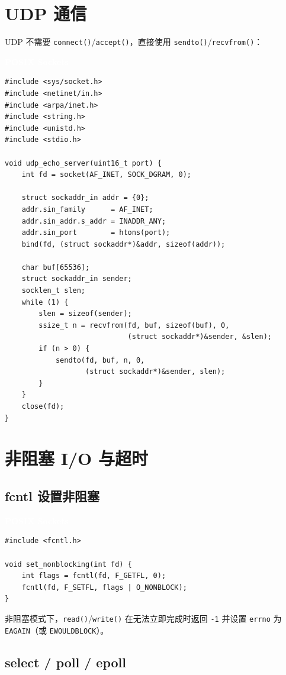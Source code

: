 \documentclass[12pt,a4paper,fontset=fandol]{ctexbook}
\newcommand{\Fn}[1]{\texttt{#1()}}
\newcommand{\Tp}[1]{\texttt{#1}}
\newcommand{\posixlabel}{%
  \noindent\begin{tcolorbox}[sharp corners,colback=posixheadbg,colframe=posixheadbg,
    left=6pt,right=6pt,top=2pt,bottom=2pt,boxrule=0pt]
  \textcolor{white}{\small\bfseries\sffamily POSIX Sockets}\end{tcolorbox}%
}
\begin{document}
\section{UDP 通信}

UDP 不需要 \Fn{connect}/\allowbreak{}\Fn{accept}，直接使用 \Fn{sendto}/\allowbreak{}\Fn{recvfrom}：

\posixlabel
\begin{lstlisting}[style=cstyle]
#include <sys/socket.h>
#include <netinet/in.h>
#include <arpa/inet.h>
#include <string.h>
#include <unistd.h>
#include <stdio.h>

void udp_echo_server(uint16_t port) {
    int fd = socket(AF_INET, SOCK_DGRAM, 0);

    struct sockaddr_in addr = {0};
    addr.sin_family      = AF_INET;
    addr.sin_addr.s_addr = INADDR_ANY;
    addr.sin_port        = htons(port);
    bind(fd, (struct sockaddr*)&addr, sizeof(addr));

    char buf[65536];
    struct sockaddr_in sender;
    socklen_t slen;
    while (1) {
        slen = sizeof(sender);
        ssize_t n = recvfrom(fd, buf, sizeof(buf), 0,
                             (struct sockaddr*)&sender, &slen);
        if (n > 0) {
            sendto(fd, buf, n, 0,
                   (struct sockaddr*)&sender, slen);
        }
    }
    close(fd);
}
\end{lstlisting}

\section{非阻塞 I/O 与超时}

\subsection{fcntl 设置非阻塞}

\posixlabel
\begin{lstlisting}[style=cstyle]
#include <fcntl.h>

void set_nonblocking(int fd) {
    int flags = fcntl(fd, F_GETFL, 0);
    fcntl(fd, F_SETFL, flags | O_NONBLOCK);
}
\end{lstlisting}

非阻塞模式下，\Fn{read}/\allowbreak{}\Fn{write} 在无法立即完成时返回 \Tp{-1}
并设置 \Tp{errno} 为 \Tp{EAGAIN}（或 \Tp{EWOULDBLOCK}）。

\subsection{select / poll / epoll}
\end{document}
